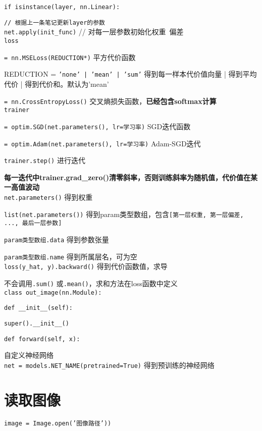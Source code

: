 \documentclass[UTF8]{ctexart}
\begin{document}
  \texttt{if isinstance(layer, nn.Linear):}

  \quad \texttt{// 根据上一条笔记更新layer的参数}\\
\texttt{net.apply(init\_func)} // 对每一层参数初始化权重\ 偏差\\
\texttt{loss}

  \texttt{= nn.MSELoss(REDUCTION*)} 平方代价函数

  \quad REDUCTION = \texttt{'none' | 'mean' | 'sum'} 得到每一样本代价值向量 | 得到平均代价 | 得到代价和。默认为'mean'

  \texttt{= nn.CrossEntropyLoss()} 交叉熵损失函数，\textbf{已经包含softmax计算}\\
\texttt{trainer}

  \texttt{= optim.SGD(net.parameters(), lr=学习率)} SGD迭代函数

  \texttt{= optim.Adam(net.parameters(), lr=学习率)} Adam-SGD迭代

  \texttt{trainer.step()} 进行迭代
  
  \textbf{每一迭代中trainer.grad\_zero()清零斜率，否则训练斜率为随机值，代价值在某一高值波动}\\
\texttt{net.parameters()} 得到权重

  \texttt{list(net.parameters())} 得到param类型数组，包含\texttt{[第一层权重, 第一层偏差, ..., 最后一层参数]}
  
  \texttt{param类型数组.data} 得到参数张量
  
  \texttt{param类型数组.name} 得到所属层名，可为空\\
\texttt{loss(y\_hat, y).backward()} 得到代价函数值，求导

  不会调用\texttt{.sum()} 或\texttt{.mean()}，求和方法在loss函数中定义\\
\texttt{class out\_image(nn.Module):}

  \texttt{def \_\_init\_\_(self):}

  \quad \texttt{super().\_\_init\_\_()}

  \texttt{def forward(self, x):}

  \quad 自定义神经网络\\
\texttt{net = models.NET\_NAME(pretrained=True)} 得到预训练的神经网络\\


\section{读取图像}
\noindent \texttt{image = Image.open('图像路径'))}
\end{document}
